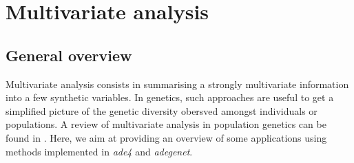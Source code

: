 \documentclass{article}
\begin{document}
\section{Multivariate analysis}

\subsection{General overview}

Multivariate analysis consists in summarising a strongly multivariate information into a few
synthetic variables.
In genetics, such approaches are useful to get a simplified picture of the genetic diversity
obersved amongst individuals or populations.
A review of multivariate analysis in population genetics can be found in \cite{tjart10}.
Here, we aim at providing an overview of some applications using methods implemented in \textit{ade4}
and \textit{adegenet}.
\\
\end{document}
